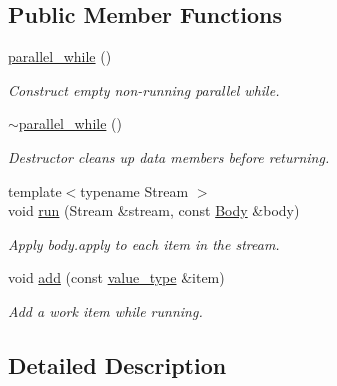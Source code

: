 \subsection*{Public Member Functions}
\begin{DoxyCompactItemize}
\item 
\hypertarget{classtbb_1_1parallel__while_a220a7307358aa36802c8754ea45ca385}{}\hyperlink{classtbb_1_1parallel__while_a220a7307358aa36802c8754ea45ca385}{parallel\+\_\+while} ()\label{classtbb_1_1parallel__while_a220a7307358aa36802c8754ea45ca385}

\begin{DoxyCompactList}\small\item\em Construct empty non-\/running parallel while. \end{DoxyCompactList}\item 
\hypertarget{classtbb_1_1parallel__while_ac2fd559c8a38639fa1ba97a0d5639ca8}{}\hyperlink{classtbb_1_1parallel__while_ac2fd559c8a38639fa1ba97a0d5639ca8}{$\sim$parallel\+\_\+while} ()\label{classtbb_1_1parallel__while_ac2fd559c8a38639fa1ba97a0d5639ca8}

\begin{DoxyCompactList}\small\item\em Destructor cleans up data members before returning. \end{DoxyCompactList}\item 
{\footnotesize template$<$typename Stream $>$ }\\void \hyperlink{classtbb_1_1parallel__while_a20607ba5faa958144787d980aa850c16}{run} (Stream \&stream, const \hyperlink{classBody}{Body} \&body)
\begin{DoxyCompactList}\small\item\em Apply body.\+apply to each item in the stream. \end{DoxyCompactList}\item 
void \hyperlink{classtbb_1_1parallel__while_a4861989d7f5e3111d264d4d6013e8fe1}{add} (const \hyperlink{classtbb_1_1parallel__while_a2442f019427e608d46801376267e44a8}{value\+\_\+type} \&item)
\begin{DoxyCompactList}\small\item\em Add a work item while running. \end{DoxyCompactList}\end{DoxyCompactItemize}


\subsection{Detailed Description}
